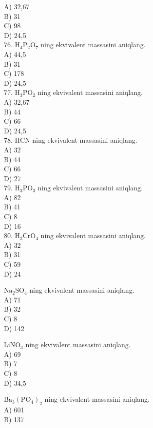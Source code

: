 A) 32,67\\
B) 31\\
C) 98\\
D) 24,5\\
76. $\mathrm{H}_{4} \mathrm{P}_{2} \mathrm{O}_{7}$ ning ekvivalent massasini aniqlang.\\
A) 44,5\\
B) 31\\
C) 178\\
D) 24,5\\
77. $\mathrm{H}_{3} \mathrm{PO}_{2}$ ning ekvivalent massasini aniqlang.\\
A) 32,67\\
B) 44\\
C) 66\\
D) 24,5\\
78. HCN ning ekvivalent massasini aniqlang.\\
A) 32\\
B) 44\\
C) 66\\
D) 27\\
79. $\mathrm{H}_{3} \mathrm{PO}_{3}$ ning ekvivalent massasini aniqlang.\\
A) 82\\
B) 41\\
C) 8\\
D) 16\\
80. $\mathrm{H}_{2} \mathrm{CrO}_{4}$ ning ekvivalent massasini aniqlang.\\
A) 32\\
B) 31\\
C) 59\\
D) 24
  \item $\mathrm{Na}_{2} \mathrm{SO}_{4}$ ning ekvivalent massasini aniqlang.\\
A) 71\\
B) 32\\
C) 8\\
D) 142\\
  \item $\mathrm{LiNO}_{3}$ ning ekvivalent massasini aniqlang.\\
A) 69\\
B) 7\\
C) 8\\
D) 34,5
  \item $\mathrm{Ba}_{3}\left(\mathrm{PO}_{4}\right)_{2}$ ning ekvivalent massasini aniqlang.\\
A) 601\\
B) 137\\
